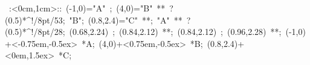 %

\hbox{
\xy    <1cm,0cm>:<0cm,1cm>::
       (-1,0)="A" ; (4,0)="B" **\dir{-} ?(0.5)*^!/8pt/{53};
       "B"; (0.8,2.4)="C" **\dir{-}; "A" **\dir{-} ?(0.5)*^!/8pt/{28}; 
       (0.68,2.24) ; (0.84,2.12) **\dir{-};  
       (0.84,2.12) ; (0.96,2.28) **\dir{-};  
       (-1,0)+<-0.75em,-0.5ex> *{A};
       (4,0)+<0.75em,-0.5ex> *{B};
       (0.8,2.4)+<0em,1.5ex> *{C};
       \endxy}
	   

